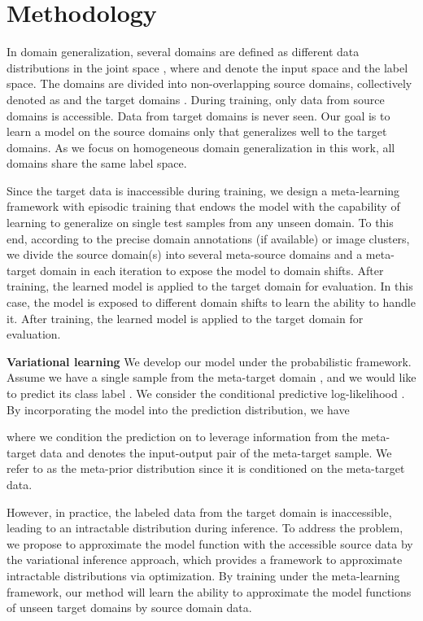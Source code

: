 \documentclass{article} \usepackage[table]{xcolor}
\begin{document}
\vspace{-3mm}
\section{Methodology}
\label{method}
\vspace{-2mm}


In domain generalization, several domains are defined as different data distributions in the joint space , where  and  denote the input space and the label space. 
The domains are divided into non-overlapping source domains, collectively denoted as  and the target domains . 
During training, only data from source domains is accessible. Data from target domains is never seen. Our goal is to learn a model on the source domains only that generalizes well to the target domains. As we focus on homogeneous domain generalization \citep{zhou2021domain} in this work, all domains share the same label space. 

Since the target data is inaccessible during training, we design a meta-learning framework with episodic training \citep{li2019episodic,balaji2018metareg} that endows the model with the capability of learning to generalize on single test samples from any unseen domain.
To this end, according to the precise domain annotations (if available) or image clusters, we divide the source domain(s)  into several meta-source domains   and a meta-target domain  in each iteration to expose the model to domain shifts. After training, the learned model is applied to the target domain  for evaluation.
In this case, the model is exposed to different domain shifts to learn the ability to handle it.
After training, the learned model is applied to the target domain  for evaluation.








\textbf{Variational learning} We develop our model under the probabilistic framework. Assume we have a single sample  from the meta-target domain , and we would like to predict its class label . We consider the conditional predictive log-likelihood . By incorporating the model  into the prediction distribution, we have

where we condition the prediction on   to leverage information from the meta-target data and  denotes the input-output pair of the meta-target sample. We refer to  as the meta-prior distribution since it is conditioned on the meta-target data. 

However, in practice, the labeled data from the target domain is inaccessible, leading to an intractable distribution  during inference.
To address the problem, we propose to approximate the model function  with the accessible source data by the variational inference approach, which provides a framework to approximate intractable distributions via optimization.
By training under the meta-learning framework, our method will learn the ability to approximate the model functions of unseen target domains by source domain data.
\end{document}
